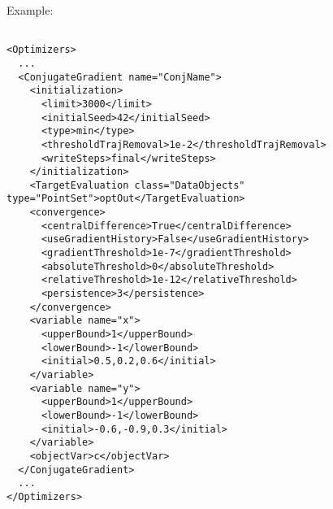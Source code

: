 Example:
\begin{lstlisting}[style=XML]

<Optimizers>
  ...
  <ConjugateGradient name="ConjName">
    <initialization>
      <limit>3000</limit>
      <initialSeed>42</initialSeed>
      <type>min</type>
      <thresholdTrajRemoval>1e-2</thresholdTrajRemoval>
      <writeSteps>final</writeSteps>
    </initialization>
    <TargetEvaluation class="DataObjects" type="PointSet">optOut</TargetEvaluation>
    <convergence>
      <centralDifference>True</centralDifference>
      <useGradientHistory>False</useGradientHistory>
      <gradientThreshold>1e-7</gradientThreshold>
      <absoluteThreshold>0</absoluteThreshold>
      <relativeThreshold>1e-12</relativeThreshold>
      <persistence>3</persistence>
    </convergence>
    <variable name="x">
      <upperBound>1</upperBound>
      <lowerBound>-1</lowerBound>
      <initial>0.5,0.2,0.6</initial>
    </variable>
    <variable name="y">
      <upperBound>1</upperBound>
      <lowerBound>-1</lowerBound>
      <initial>-0.6,-0.9,0.3</initial>
    </variable>
    <objectVar>c</objectVar>
  </ConjugateGradient>
  ...
</Optimizers>


\end{lstlisting}
